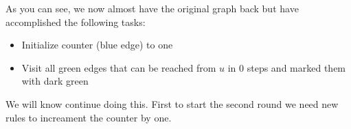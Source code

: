 \begin{center}
\end{center}

As you can see, we now almost have the original graph back but have accomplished the following tasks:
\begin{itemize}
    \item Initialize counter (blue edge) to one
    \item Visit all green edges that can be reached from $u$ in 0 steps and marked them with dark green
\end{itemize}

We will know continue doing this.
First to start the second round we need new rules to increament the counter by one.

